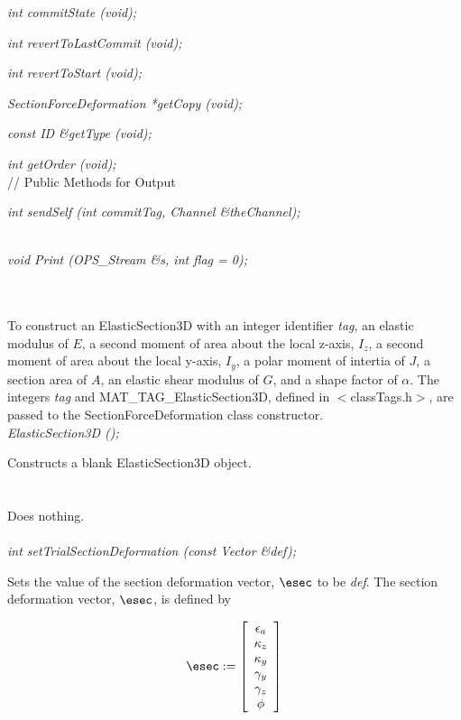 {\em int commitState (void); } 

{\em int revertToLastCommit (void); } 

{\em int revertToStart (void); } 

{\em SectionForceDeformation *getCopy (void); } 

{\em const ID \&getType (void); } 

{\em int getOrder (void); } \\ 

// Public Methods for Output

{\em int sendSelf (int commitTag, Channel \&theChannel); }

\\
{\em void Print (OPS_Stream \&s, int flag = 0);} 


  \\
 \\ 
To construct an ElasticSection3D with an integer identifier {\em
tag}, an elastic modulus of $E$, a second moment of area about the local
z-axis, $I_z$, a second moment of area about the local y-axis, $I_y$, a polar
moment of intertia of $J$, a section area of $A$, an elastic shear modulus of $G$, 
and a shape factor of $\alpha$. The integers {\em tag} and MAT\_TAG\_ElasticSection3D,
defined in $<$classTags.h$>$, are passed to the SectionForceDeformation
class constructor. \\

{\em ElasticSection3D ();} 

Constructs a blank ElasticSection3D object. \\

 \\
 \\ 
Does nothing. \\

 \\
{\em int setTrialSectionDeformation (const Vector \&def); }  

Sets the value of the section deformation vector, $\esec$ to be {\em
def}. The section deformation vector, $\esec$, is defined by

\begin{equation}
\esec := \left[
   \begin{array}{c}
       \epsilon_a \\
       \kappa_z   \\
       \kappa_y   \\
       \gamma_y   \\
       \gamma_z   \\
       \phi
   \end{array} 
 \right]
\end{equation}

